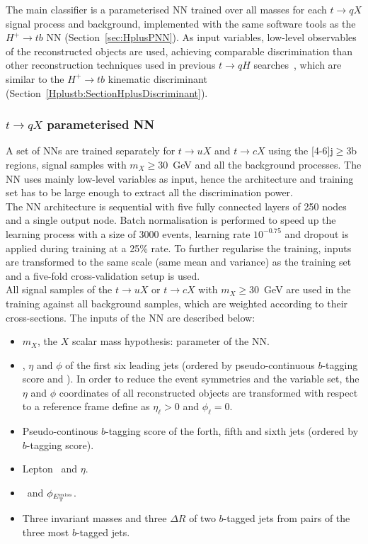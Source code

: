 The main classifier is a parameterised NN trained over all masses for each $t\to qX$ signal process and background, implemented with the same software tools as the $H^+\to tb$ NN (Section~\ref{sec:HplusPNN}). As input variables, low-level observables of the reconstructed objects are used, achieving comparable discrimination than other reconstruction techniques used in previous $t\to qH$ searches~\cite{TOPQ-2017-07}, which are similar to the $H^+\to tb$ kinematic discriminant (Section~\ref{Hplustb:SectionHplusDiscriminant}).

\subsubsection{$t\to qX$ parameterised NN}

A set of NNs are trained separately for $t\to uX$ and $t\to cX$ using the [4-6]j$\geq$3b regions, signal samples with $m_X\geq$30~GeV and all the background processes. The NN uses mainly low-level variables as input, hence the architecture and training set has to be large enough to extract all the discrimination power.\\

The NN architecture is sequential with five fully connected layers of 250 nodes and a single output node. Batch normalisation is performed to speed up the learning process with a size of 3000 events, learning rate $10^{-0.75}$ and dropout is applied during training at a 25\% rate. To further regularise the training, inputs are transformed to the same scale (same mean and variance) as the training set and a five-fold cross-validation setup is used.\\

All signal samples of the $t\to uX$ or $t\to cX$ with $m_X\geq$30~GeV are used in the training against all background samples, which are weighted according to their cross-sections. The inputs of the NN are described below:

\begin{itemize}
    \item $m_X$, the $X$ scalar mass hypothesis: parameter of the NN.
    \item \pT, $\eta$ and $\phi$ of the first six leading jets (ordered by pseudo-continuous $b$-tagging score and \pT). In order to reduce the event symmetries and the variable set, the $\eta$ and $\phi$ coordinates of all reconstructed objects are transformed with respect to a reference frame define as $\eta_{\ell}>0$ and $\phi_{\ell}=0$.
    \item Pseudo-continous $b$-tagging score of the forth, fifth and sixth jets (ordered by $b$-tagging score).
    \item Lepton \pT\ and $\eta$.
    \item \MET\ and $\phi_{E_{\text{T}}^{\text{miss}}}$.
    \item Three invariant masses and three $\Delta R$ of two $b$-tagged jets from pairs of the three most $b$-tagged jets. 
\end{itemize}

